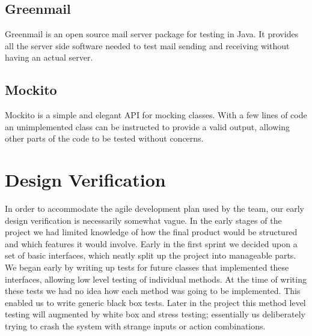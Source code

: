 \subsection{Greenmail}
Greenmail is an open source mail server package for testing in Java. It provides all the server side software needed to test mail sending and receiving without having an actual server.

\subsection{Mockito}
Mockito is a simple and elegant API for mocking classes. With a few lines of code an unimplemented class can be instructed to provide a valid output, allowing other parts of the code to be tested without concerns.

\section{Design Verification}
In order to accommodate the agile development plan used by the team, our early design verification is necessarily somewhat vague. In the early stages of the project we had limited knowledge of how the final product would be structured and which features it would involve.
\newline
\newline
Early in the first sprint we decided upon a set of basic interfaces, which neatly split up the project into manageable parts. We began early by writing up tests for future classes that implemented these interfaces, allowing low level testing of individual methods. At the time of writing these tests we had no idea how each method was going to be implemented. This enabled us to write generic black box tests.
\newline
\newline
Later in the project this method level testing will augmented by white box and stress testing; essentially us deliberately trying to crash the system with strange inputs or action combinations. 

